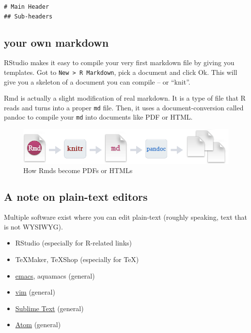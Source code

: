 \documentclass[
  letterpaper,
]{book}
\providecommand{\tightlist}{%
  \setlength{\itemsep}{0pt}\setlength{\parskip}{0pt}}\usepackage{longtable,booktabs,array}
\theoremstyle{definition}
\theoremstyle{definition}
\theoremstyle{plain}
\theoremstyle{definition}
\theoremstyle{plain}
\theoremstyle{plain}
\theoremstyle{remark}
\begin{document}
\begin{verbatim}
# Main Header
## Sub-headers
\end{verbatim}

\hypertarget{your-own-markdown}{%
\subsection{your own markdown}\label{your-own-markdown}}

RStudio makes it easy to compile your very first markdown file by giving
you templates. Got to \texttt{New\ \textgreater{}\ R\ Markdown}, pick a
document and click Ok. This will give you a skeleton of a document you
can compile -- or ``knit''.

Rmd is actually a slight modification of real markdown. It is a type of
file that R reads and turns into a proper \texttt{md} file. Then, it
uses a document-conversion called pandoc to compile your \texttt{md}
into documents like PDF or HTML.

\begin{figure}

{\centering \includegraphics{./images/RMarkdownFlow.png}

}

\caption{How Rmds become PDFs or HTMLs}

\end{figure}

\hypertarget{a-note-on-plain-text-editors}{%
\subsection{A note on plain-text
editors}\label{a-note-on-plain-text-editors}}

Multiple software exist where you can edit plain-text (roughly speaking,
text that is not WYSIWYG).

\begin{itemize}
\tightlist
\item
  RStudio (especially for R-related links)
\item
  TeXMaker, TeXShop (especially for TeX)
\item
  \href{https://www.gnu.org/software/emacs/}{emacs}, aquamacs (general)
\item
  \href{http://www.vim.org/download.php}{vim} (general)
\item
  \href{https://www.sublimetext.com}{Sublime Text} (general)
\item
  \href{https://atom.io/}{Atom} (general)
\end{itemize}
\end{document}
